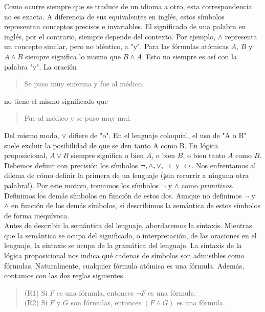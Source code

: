 \documentclass[12pt,a4paper]{book}
\newcommand{\comillas}[1]{"#1"}
\begin{document}
    Como ocurre siempre que se traduce de un idioma a otro, esta correspondencia no es exacta. A diferencia de sus equivalentes en inglés,
    estos símbolos representan conceptos precisos e invariables. El significado de una palabra en inglés, por el contrario, siempre depende
    del contexto. Por ejemplo, $\wedge$ representa un concepto similar, pero no idéntico, a \comillas{y}. Para las fórmulas atómicas
    $A$, $B$ y $A\wedge B$ siempre significa lo mismo que $B\wedge A$. Esto no siempre es así con la palabra \comillas{y}. La oración

    \begin{quote}
        Se puso muy enferma y fue al médico.
    \end{quote}

    no tiene el mismo significado que

    \begin{quote}
        Fue al médico y se puso muy mal.
    \end{quote}

    Del mismo modo, $\vee$ difiere de \comillas{o}. En el lenguaje coloquial, el uso de \comillas{A o B} suele excluir la posibilidad
    de que se den tanto A como B. En lógica proposicional, $A\vee B$ siempre significa o bien $A$, o bien $B$, o bien tanto $A$
    como $B$.\\
    Debemos definir con precisión los símbolos $\neg,\wedge,\vee,\rightarrow\text{ y }\leftrightarrow$. Nos enfrentamos
    al dilema de cómo definir la primera de un lenguaje (¡sin recurrir a ninguna otra palabra!). Por este motivo,
    tomamos los símbolos $\neg$ y $\wedge$ como \textit{primitivos}. Definimos los demás símbolos en función de
    estos dos. Aunque no definimos $\neg$ y $\wedge$ en función de los demás símbolos, sí describimos la semántica
    de estos símbolos de forma inequívoca.\\
    Antes de describir la semántica del lenguaje, abordaremos la sintaxis. Mientras que la semántica se ocupa del significado, o interpretación,
    de las oraciones en el lenguaje, la sintaxis se ocupa de la gramática del lenguaje. La sintaxis de la lógica proposicional nos indica
    qué cadenas de símbolos son admisibles como fórmulas. Naturalmente, cualquier fórmula atómica es una fórmula. Además, contamos con las dos
    reglas siguientes.

    \begin{quote}
        (R1) Si $F$ es una fórmula, entonces $\neg F$ es una fórmula.\\
        (R2) Si $F$ y $G$ son fórmulas, entonces $(F\wedge G)$ es una fórmula.
    \end{quote}
\end{document}
